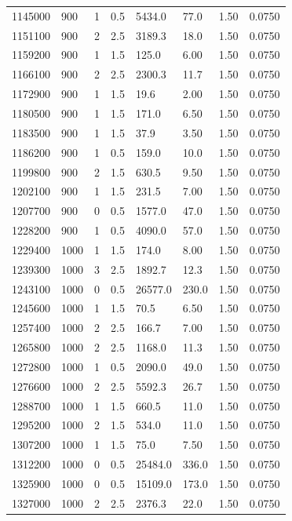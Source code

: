 \documentclass[preview]{standalone}
\begin{document}
{{{{{\begin{tabular}{L{1.2cm}C{1.2cm} C{0.3cm}C{0.5cm} C{1.4cm}C{1.4cm} C{1.4cm}C{1.4cm}}
  1145000  &   900  & 1     & 0.5 &  5434.0  & 77.0  & 1.50 &  0.0750   \\ 
  1151100  &   900  & 2     & 2.5 &  3189.3  & 18.0  & 1.50 &  0.0750   \\ 
  1159200  &   900  & 1     & 1.5 &  125.0  & 6.00  & 1.50 &  0.0750   \\ 
  1166100  &   900  & 2     & 2.5 &  2300.3  & 11.7  & 1.50 &  0.0750   \\ 
  1172900  &   900  & 1     & 1.5 &  19.6  & 2.00  & 1.50 &  0.0750   \\ 
  1180500  &   900  & 1     & 1.5 &  171.0  & 6.50  & 1.50 &  0.0750   \\ 
  1183500  &   900  & 1     & 1.5 &  37.9  & 3.50  & 1.50 &  0.0750   \\ 
  1186200  &   900  & 1     & 0.5 &  159.0  & 10.0  & 1.50 &  0.0750   \\ 
  1199800  &   900  & 2     & 1.5 &  630.5  & 9.50  & 1.50 &  0.0750   \\ 
  1202100  &   900  & 1     & 1.5 &  231.5  & 7.00  & 1.50 &  0.0750   \\ 
  1207700  &   900  & 0     & 0.5 &  1577.0  & 47.0  & 1.50 &  0.0750   \\ 
  1228200  &   900  & 1     & 0.5 &  4090.0  & 57.0  & 1.50 &  0.0750   \\ 
  1229400  &  1000  & 1     & 1.5 &  174.0  & 8.00  & 1.50 &  0.0750   \\ 
  1239300  &  1000  & 3     & 2.5 &  1892.7  & 12.3  & 1.50 &  0.0750   \\ 
  1243100  &  1000  & 0     & 0.5 &  26577.0  & 230.0  & 1.50 &  0.0750   \\ 
  1245600  &  1000  & 1     & 1.5 &  70.5  & 6.50  & 1.50 &  0.0750   \\ 
  1257400  &  1000  & 2     & 2.5 &  166.7  & 7.00  & 1.50 &  0.0750   \\ 
  1265800  &  1000  & 2     & 2.5 &  1168.0  & 11.3  & 1.50 &  0.0750   \\ 
  1272800  &  1000  & 1     & 0.5 &  2090.0  & 49.0  & 1.50 &  0.0750   \\ 
  1276600  &  1000  & 2     & 2.5 &  5592.3  & 26.7  & 1.50 &  0.0750   \\ 
  1288700  &  1000  & 1     & 1.5 &  660.5  & 11.0  & 1.50 &  0.0750   \\ 
  1295200  &  1000  & 2     & 1.5 &  534.0  & 11.0  & 1.50 &  0.0750   \\ 
  1307200  &  1000  & 1     & 1.5 &  75.0  & 7.50  & 1.50 &  0.0750   \\ 
  1312200  &  1000  & 0     & 0.5 &  25484.0  & 336.0  & 1.50 &  0.0750   \\ 
  1325900  &  1000  & 0     & 0.5 &  15109.0  & 173.0  & 1.50 &  0.0750   \\ 
  1327000  &  1000  & 2     & 2.5 &  2376.3  & 22.0  & 1.50 &  0.0750   \\ 
\hline 
\end{tabular} 

}}}}}
\end{document}
